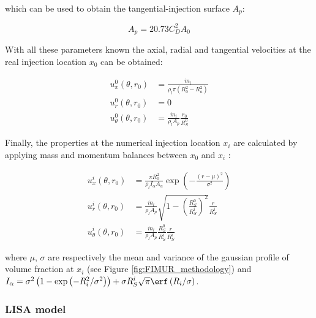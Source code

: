 which can be used to obtain the tangential-injection surface $A_p$:

\begin{equation}
A_p = 20.73 C_D^2 A_0
\end{equation}

With all these parameters known the axial, radial and tangential velocities at the real injection location $x_0$ can be obtained:

\begin{subequations}
\label{eq:ch3_FIMUR_velocities_at_x0}
\begin{align}
u_x^0 \left( \theta, r_0 \right) &= \frac{\dot{m}_l}{\rho_l \pi \left( R_0^2 - R_a^2 \right)} \\
u_r^0 \left( \theta, r_0 \right) &= 0 \\
u_\theta^0 \left( \theta, r_0 \right) &= \frac{\dot{m}_l}{\rho_l A_p} \frac{r_0}{R_S^0} 
\end{align}
\end{subequations}

Finally, the properties at the numerical injection location $x_i$ are calculated by applying mass and momentum balances between $x_0$ and $x_i$ :

\begin{subequations}
\begin{align}
u_x^i \left( \theta, r_0 \right) &= \frac{\pi R_0^2}{\rho_l I_\alpha A_u} \exp \left( - \frac{\left( r - \mu \right)^2}{\sigma^2} \right) \\
u_r^i \left( \theta, r_0 \right) &= \frac{\dot{m}_l}{\rho_l A_p} \sqrt{1 - \left( \frac{R_S^0}{R_S^i}  \right)^2} \frac{r}{R_S^i} \\
u_\theta^i \left( \theta, r_0 \right) &= \frac{\dot{m}_l}{\rho_l A_p} \frac{R_S^0}{R_S^i} \frac{r}{R_S^i} 
\end{align}
\end{subequations}

where $\mu$, $\sigma$ are respectively the mean and variance of the gaussian profile of volume fraction at $x_i$ (see Figure \ref{fig:FIMUR_methodology}) and $I_\alpha = \sigma^2 \left( 1 - \exp \left( - R_i^2/\sigma^2 \right) \right) + \sigma R_S^i \sqrt{\pi} \erf \left( R_i / \sigma \right)$.



\subsubsection*{LISA model}

